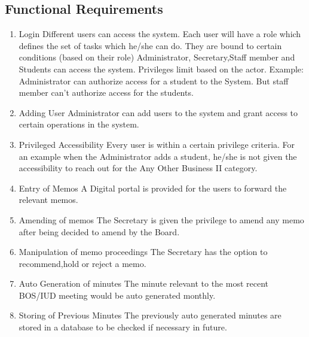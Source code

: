 \documentclass[a4paper,beamer]{article}
\begin{document}
	\subsection{Functional Requirements}
	\begin{enumerate}
		\item Login \newline
		Different users can access the system. Each user will have a role which defines the set of tasks which he/she can do. They are bound to certain conditions (based on their role) Administrator, Secretary,Staff member and Students can access the system. Privileges limit based on the actor. Example: Administrator can authorize access for a student to the System. But staff member can’t authorize access for the students.
		
		\item Adding User \newline
		Administrator can add users to the system and grant access to certain operations in the system.
		
		\item Privileged Accessibility \newline
		Every user is within a certain privilege criteria. For an example when the Administrator adds a student, he/she is not given the accessibility to reach out for the Any Other Business II category.
		
		\item Entry of Memos \newline
		A Digital portal is provided for the users to forward the relevant memos.
		
		\item Amending of memos \newline
		The Secretary is given the privilege to amend any memo after being decided to amend by the Board.
		
		\item Manipulation of memo proceedings \newline
		The Secretary has the option to recommend,hold or reject a memo.
		
		\item Auto Generation of minutes \newline
		The minute relevant to the most recent BOS/IUD meeting would be auto generated monthly. 
		
		\item Storing of Previous Minutes \newline The previously auto generated minutes are stored in a database to be checked if necessary in future.
		

\end{enumerate}
\end{document}
